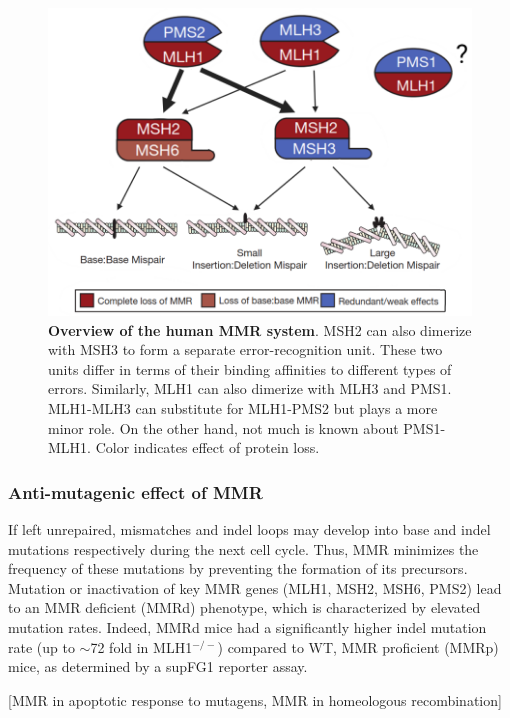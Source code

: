 \documentclass[fleqn,10pt]{olplainarticle}
\begin{document}
\begin{figure}[!h]

\centering
\includegraphics[scale=0.55]{MMR.png}
\caption{\textbf{Overview of the human MMR system}. MSH2 can also dimerize with MSH3 to form a separate error-recognition unit. These two units differ in terms of their binding affinities to different types of errors. Similarly, MLH1 can also dimerize with MLH3 and PMS1. MLH1-MLH3 can substitute for MLH1-PMS2 but plays a more minor role. On the other hand, not much is known about PMS1-MLH1. Color indicates effect of protein loss.}

\end{figure}

\subsubsection{Anti-mutagenic effect of MMR}

If left unrepaired, mismatches and indel loops may develop into base and indel mutations respectively during the next cell cycle. Thus, MMR minimizes the frequency of these mutations by preventing the formation of its precursors. Mutation or inactivation of key MMR genes (MLH1, MSH2, MSH6, PMS2) lead to an MMR deficient (MMRd) phenotype, which is characterized by elevated mutation rates. Indeed, MMRd mice had a significantly higher indel mutation rate (up to $\sim$72 fold in MLH1$^{-/-}$) compared to WT, MMR proficient (MMRp) mice, as determined by a supFG1 reporter assay.

[MMR in apoptotic response to mutagens, MMR in homeologous recombination]
\end{document}
